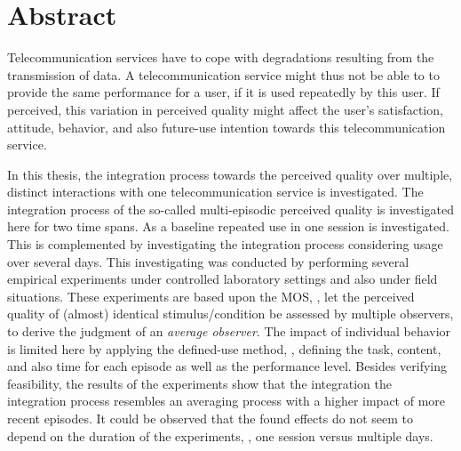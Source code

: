 \begingroup
\let\clearpage\relax
\let\cleardoublepage\relax
\let\cleardoublepage\relax

\chapter*{Abstract}
Telecommunication services have to cope with degradations resulting from the transmission of data.
A telecommunication service might thus not be able to to provide the same performance for a user, if it is used repeatedly by this user.
If perceived, this variation in perceived quality might affect the user's satisfaction, attitude, behavior, and also future-use intention towards this telecommunication service.

In this thesis, the integration process towards the perceived quality over multiple, distinct interactions with one telecommunication service is investigated.
The integration process of the so-called multi-episodic perceived quality is investigated here for two time spans.
As a baseline repeated use in one session is investigated. %
This is complemented by investigating the integration process considering usage over several days.
This investigating was conducted by performing several empirical experiments under controlled laboratory settings and also under field situations.
These experiments are based upon the \acs{MOS}, \ie, let the perceived quality of (almost) identical stimulus/condition be assessed by multiple observers, to derive the judgment of an \emph{average observer}.
The impact of individual behavior is limited here by applying the defined-use method, \ie, defining the task, content, and also time for each episode as well as the performance level.
Besides verifying feasibility, the results of the experiments show that the integration the integration process resembles an averaging process with a higher impact of more recent episodes.
It could be observed that the found effects do not seem to depend on the duration of the experiments, \ie, one session versus multiple days.

%
%
%
\endgroup			
\vfill